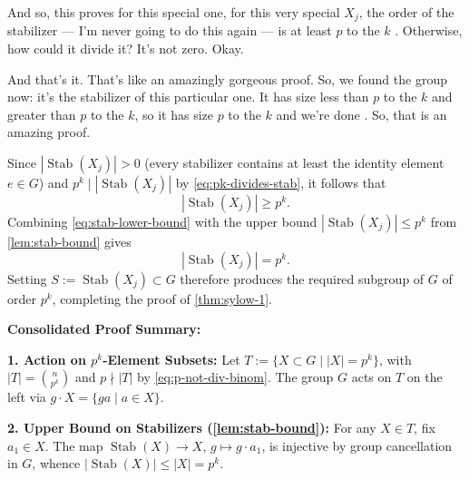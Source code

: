 \begin{proofWrapper}
\begin{speech}[00:15:49 - 00:16:33]
And so, this proves for this special one, for this very special $X_j$, the order of the stabilizer --- I'm never going to do this again --- is at least $p$ to the $k$ . Otherwise, how could it divide it? It's not zero. Okay.

And that's it. That's like an amazingly gorgeous proof. So, we found the group now: it's the stabilizer of this particular one. It has size less than $p$ to the $k$ and greater than $p$ to the $k$, so it has size $p$ to the $k$ and we're done . So, that is an amazing proof.
\end{speech}

\begin{content}
Since $|\operatorname{Stab}(X_j)| > 0$ (every stabilizer contains at least the identity element $e \in G$) and $p^k \mid |\operatorname{Stab}(X_j)|$ by \eqref{eq:pk-divides-stab}, it follows that
\begin{equation}\label{eq:stab-lower-bound}
|\operatorname{Stab}(X_j)| \ge p^k.
\end{equation}
Combining \eqref{eq:stab-lower-bound} with the upper bound $|\operatorname{Stab}(X_j)| \le p^k$ from \cref{lem:stab-bound} gives
\begin{equation}\label{eq:stab-exact-order}
|\operatorname{Stab}(X_j)| = p^k.
\end{equation}
Setting $S := \operatorname{Stab}(X_j) \subset G$ therefore produces the required subgroup of $G$ of order $p^k$, completing the proof of \cref{thm:sylow-1}.

\par\vspace{1ex}\noindent
\textbf{Consolidated Proof Summary:}
\par\vspace{0.5ex}\noindent
\textbf{1. Action on $p^k$-Element Subsets:} Let $T := \bigl\{ X \subset G \;\big|\; |X| = p^k \bigr\}$, with $|T| = \binom{n}{p^k}$ and $p \nmid |T|$ by \eqref{eq:p-not-div-binom}. The group $G$ acts on $T$ on the left via $g \cdot X = \{ga \mid a \in X\}$.

\textbf{2. Upper Bound on Stabilizers (\cref{lem:stab-bound}):} For any $X \in T$, fix $a_1 \in X$. The map $\operatorname{Stab}(X) \to X$, $g \mapsto g \cdot a_1$, is injective by group cancellation in $G$, whence $|\operatorname{Stab}(X)| \le |X| = p^k$.


\end{content}
\end{proofWrapper}
